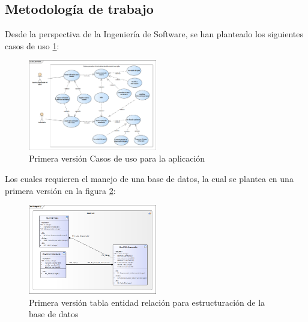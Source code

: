 \documentclass[letterpaper, 10 pt, conference]{ieeeconf}  %
\begin{document}

\subsection{Metodolog\'ia de trabajo}

Desde la perspectiva de la Ingenier\'ia de Software, se han planteado los siguientes casos de uso \ref{fig:Casosdeuso}:

\begin{figure}
\centering
\includegraphics[width=0.5\textwidth]{casousoheartcat.png}
\caption{Primera versi\'on Casos de uso para la aplicaci\'on}
\label{fig:Casosdeuso}
\end{figure}

Los cuales requieren el manejo de una base de datos, la cual se plantea en una primera versi\'on en la figura \ref{fig:entidades}:

\begin{figure}
\centering
\includegraphics[width=0.5\textwidth]{bdvunoheartcat.png}
\caption{Primera versi\'on tabla entidad relaci\'on para estructuraci\'on de la base de datos}
\label{fig:entidades}
\end{figure}
\end{document}
